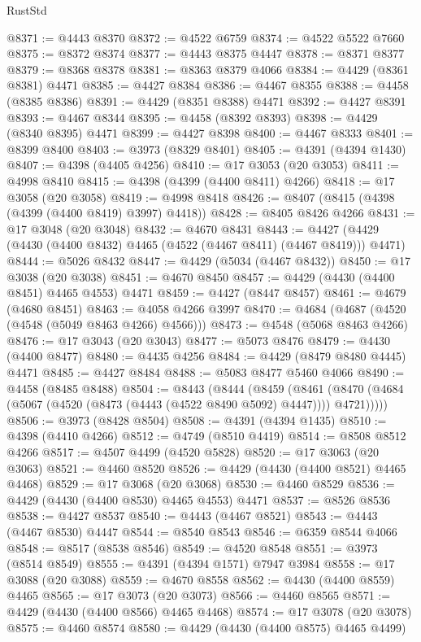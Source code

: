 \begin{lexlean}{RustStd}
\begin{coremodule}
{\begin{coremodule}
{{{{{{{{{{{{{{{{{{{{{{{{{{{{{{{{{{{{{{{{{{{{{{{{{{{{{{{{{{{{{{{{{{{{@8371 := @4443 @8370
@8372 := @4522 @6759
@8374 := @4522 @5522 @7660
@8375 := @8372 @8374
@8377 := @4443 @8375 @4447
@8378 := @8371 @8377
@8379 := @8368 @8378
@8381 := @8363 @8379 @4066
@8384 := @4429 (@8361 @8381) @4471
@8385 := @4427 @8384
@8386 := @4467 @8355
@8388 := @4458 (@8385 @8386)
@8391 := @4429 (@8351 @8388) @4471
@8392 := @4427 @8391
@8393 := @4467 @8344
@8395 := @4458 (@8392 @8393)
@8398 := @4429 (@8340 @8395) @4471
@8399 := @4427 @8398
@8400 := @4467 @8333
@8401 := @8399 @8400
@8403 := @3973 (@8329 @8401)
@8405 := @4391 (@4394 @1430)
@8407 := @4398 (@4405 @4256)
@8410 := @17 @3053 (@20 @3053)
@8411 := @4998 @8410
@8415 := @4398 (@4399 (@4400 @8411) @4266)
@8418 := @17 @3058 (@20 @3058)
@8419 := @4998 @8418
@8426 := @8407 (@8415 (@4398 (@4399 (@4400 @8419) @3997) @4418))
@8428 := @8405 @8426 @4266
@8431 := @17 @3048 (@20 @3048)
@8432 := @4670 @8431
@8443 := @4427 (@4429 (@4430 (@4400 @8432) @4465 (@4522 (@4467 @8411) (@4467 @8419))) @4471)
@8444 := @5026 @8432
@8447 := @4429 (@5034 (@4467 @8432))
@8450 := @17 @3038 (@20 @3038)
@8451 := @4670 @8450
@8457 := @4429 (@4430 (@4400 @8451) @4465 @4553) @4471
@8459 := @4427 (@8447 @8457)
@8461 := @4679 (@4680 @8451)
@8463 := @4058 @4266 @3997
@8470 := @4684 (@4687 (@4520 (@4548 (@5049 @8463 @4266) @4566)))
@8473 := @4548 (@5068 @8463 @4266)
@8476 := @17 @3043 (@20 @3043)
@8477 := @5073 @8476
@8479 := @4430 (@4400 @8477)
@8480 := @4435 @4256
@8484 := @4429 (@8479 @8480 @4445) @4471
@8485 := @4427 @8484
@8488 := @5083 @8477 @5460 @4066
@8490 := @4458 (@8485 @8488)
@8504 := @8443
    (@8444
      (@8459
        (@8461 (@8470 (@4684 (@5067 (@4520 (@8473 (@4443 (@4522 @8490 @5092) @4447)))) @4721)))))
@8506 := @3973 (@8428 @8504)
@8508 := @4391 (@4394 @1435)
@8510 := @4398 (@4410 @4266)
@8512 := @4749 (@8510 @4419)
@8514 := @8508 @8512 @4266
@8517 := @4507 @4499 (@4520 @5828)
@8520 := @17 @3063 (@20 @3063)
@8521 := @4460 @8520
@8526 := @4429 (@4430 (@4400 @8521) @4465 @4468)
@8529 := @17 @3068 (@20 @3068)
@8530 := @4460 @8529
@8536 := @4429 (@4430 (@4400 @8530) @4465 @4553) @4471
@8537 := @8526 @8536
@8538 := @4427 @8537
@8540 := @4443 (@4467 @8521)
@8543 := @4443 (@4467 @8530) @4447
@8544 := @8540 @8543
@8546 := @6359 @8544 @4066
@8548 := @8517 (@8538 @8546)
@8549 := @4520 @8548
@8551 := @3973 (@8514 @8549)
@8555 := @4391 (@4394 @1571) @7947 @3984
@8558 := @17 @3088 (@20 @3088)
@8559 := @4670 @8558
@8562 := @4430 (@4400 @8559) @4465
@8565 := @17 @3073 (@20 @3073)
@8566 := @4460 @8565
@8571 := @4429 (@4430 (@4400 @8566) @4465 @4468)
@8574 := @17 @3078 (@20 @3078)
@8575 := @4460 @8574
@8580 := @4429 (@4430 (@4400 @8575) @4465 @4499)
}}}}}}}}}}}}}}}}}}}}}}}}}}}}}}}}}}}}}}}}}}}}}}}}}}}}}}}}}}}}}}}}}}}}
\end{coremodule}}
\end{coremodule}
\end{lexlean}
